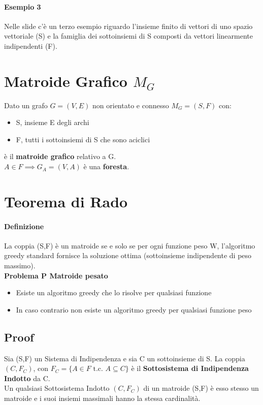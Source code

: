 \paragraph*{Esempio 3} Nelle slide c'è un terzo esempio riguardo l'insieme finito di vettori
di uno spazio vettoriale (S) e la famiglia dei sottoinsiemi di S composti da vettori 
linearmente indipendenti (F).
\section{Matroide Grafico $M_G$}
Dato un grafo $G=(V,E)$ non orientato e connesso $M_G = (S,F)$ con:
\begin{itemize}
    \item S, insieme E degli archi
    \item F, tutti i sottoinsiemi di S che sono aciclici
\end{itemize}
è il \textbf{matroide grafico} relativo a G.\\
$A \in F \implies G_A = (V,A)$ è una \textbf{foresta}.

\section{Teorema di Rado}
\paragraph*{Definizione} La coppia (S,F) è un matroide se e solo se per ogni funzione peso W,
l'algoritmo greedy standard fornisce la soluzione ottima (sottoinsieme indipendente di peso massimo).\\
\textbf{Problema P \ra Matroide pesato}
\begin{itemize}
    \item Esiste un algoritmo greedy che lo risolve per qualsiasi funzione
    \item In caso contrario \ra non esiste un algoritmo greedy per qualsiasi funzione peso
\end{itemize}
\subsection{Proof}
Sia (S,F) un Sistema di Indipendenza e sia C un sottoinsieme di S. La coppia $(C,F_C)$,
con $F_C=\{A \in F \text{ t.c. } A \subseteq C \}$ è il \textbf{Sottosistema di Indipendenza Indotto}
da C.\\
Un qualsiasi Sottosistema Indotto $(C, F_C)$ di un matroide (S,F) è esso stesso un
matroide e i suoi insiemi massimali hanno la stessa cardinalità.
